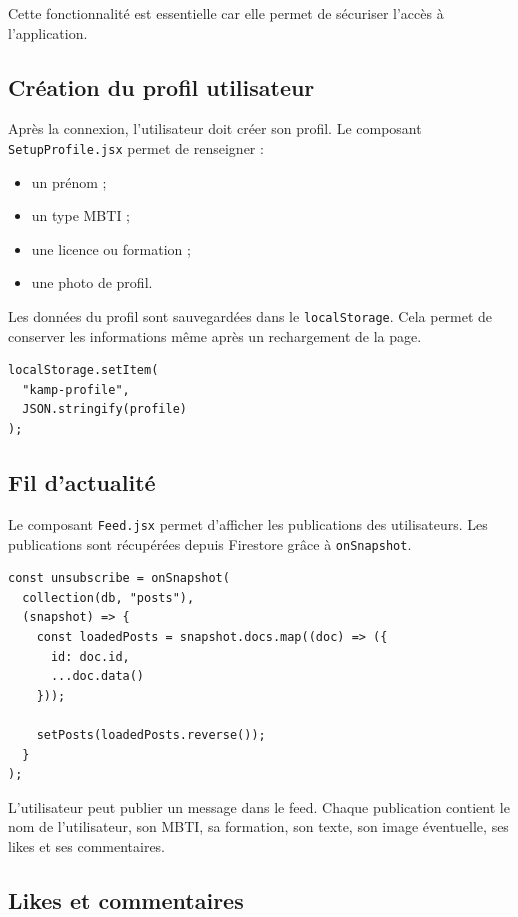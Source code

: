 \documentclass[a4paper, 12pt, twoside]{article}
\begin{document}
Cette fonctionnalité est essentielle car elle permet de sécuriser l'accès à l'application.

\subsection{Création du profil utilisateur}

Après la connexion, l'utilisateur doit créer son profil. 
Le composant \texttt{SetupProfile.jsx} permet de renseigner :

\begin{itemize}
    \item un prénom ;
    \item un type MBTI ;
    \item une licence ou formation ;
    \item une photo de profil.
\end{itemize}

Les données du profil sont sauvegardées dans le \texttt{localStorage}. 
Cela permet de conserver les informations même après un rechargement de la page.

\begin{lstlisting}
localStorage.setItem(
  "kamp-profile",
  JSON.stringify(profile)
);
\end{lstlisting}

\subsection{Fil d'actualité}

Le composant \texttt{Feed.jsx} permet d'afficher les publications des utilisateurs. 
Les publications sont récupérées depuis Firestore grâce à \texttt{onSnapshot}.

\begin{lstlisting}
const unsubscribe = onSnapshot(
  collection(db, "posts"),
  (snapshot) => {
    const loadedPosts = snapshot.docs.map((doc) => ({
      id: doc.id,
      ...doc.data()
    }));

    setPosts(loadedPosts.reverse());
  }
);
\end{lstlisting}

L'utilisateur peut publier un message dans le feed. 
Chaque publication contient le nom de l'utilisateur, son MBTI, sa formation, son texte, son image éventuelle, ses likes et ses commentaires.

\subsection{Likes et commentaires}
\end{document}
